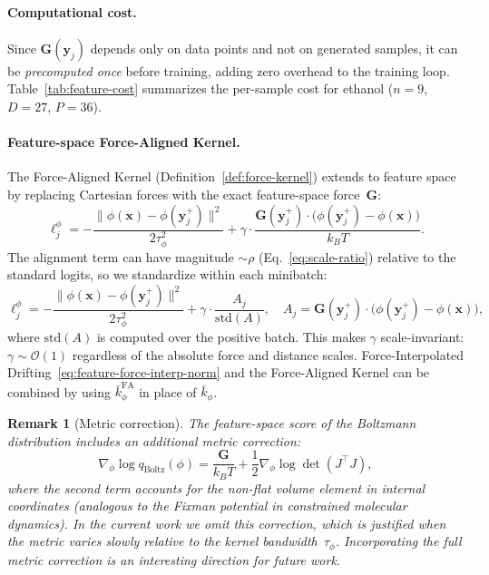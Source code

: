 \documentclass[11pt]{article}
\newtheorem{remark}{Remark}[section]
\newcommand{\bx}{\mathbf{x}}
\newcommand{\by}{\mathbf{y}}
\newcommand{\bG}{\mathbf{G}}
\newcommand{\kbar}{\bar{k}}
\newcommand{\kBT}{k_BT}
\begin{document}
\paragraph{Computational cost.}
Since $\bG(\by_j)$ depends only on data points and not on generated samples, it can be \emph{precomputed once} before training, adding zero overhead to the training loop.
Table~\ref{tab:feature-cost} summarizes the per-sample cost for ethanol ($n = 9$, $D = 27$, $P = 36$).

\paragraph{Feature-space Force-Aligned Kernel.}
The Force-Aligned Kernel (Definition~\ref{def:force-kernel}) extends to feature space by replacing Cartesian forces with the exact feature-space force~$\bG$:
\begin{equation}
    \ell_j^{\phi} = -\frac{\|\phi(\bx) - \phi(\by_j^+)\|^2}{2\tau_\phi^2} + \gamma \cdot \frac{\bG(\by_j^+) \cdot \big(\phi(\by_j^+) - \phi(\bx)\big)}{\kBT}.
    \label{eq:feature-force-kernel-logits}
\end{equation}
The alignment term can have magnitude ${\sim}\rho$ (Eq.~\ref{eq:scale-ratio}) relative to the standard logits, so we standardize within each minibatch:
\begin{equation}
    \ell_j^{\phi} = -\frac{\|\phi(\bx) - \phi(\by_j^+)\|^2}{2\tau_\phi^2} + \gamma \cdot \frac{A_j}{\mathrm{std}(A)}, \quad A_j = \bG(\by_j^+) \cdot \big(\phi(\by_j^+) - \phi(\bx)\big),
    \label{eq:feature-force-kernel-norm}
\end{equation}
where $\mathrm{std}(A)$ is computed over the positive batch.
This makes $\gamma$ scale-invariant: $\gamma \sim \mathcal{O}(1)$ regardless of the absolute force and distance scales.
Force-Interpolated Drifting~\eqref{eq:feature-force-interp-norm} and the Force-Aligned Kernel can be combined by using $\kbar_\phi^{\text{FA}}$ in place of $\kbar_\phi$.

\begin{remark}[Metric correction]
\label{rem:metric}
The feature-space score of the Boltzmann distribution includes an additional \emph{metric correction}:
\begin{equation}
    \nabla_\phi \log q_{\text{Boltz}}(\phi) = \frac{\bG}{\kBT} + \frac{1}{2}\nabla_\phi \log\det(J^\top J),
    \label{eq:metric-correction}
\end{equation}
where the second term accounts for the non-flat volume element in internal coordinates (analogous to the Fixman potential in constrained molecular dynamics).
In the current work we omit this correction, which is justified when the metric varies slowly relative to the kernel bandwidth~$\tau_\phi$.
Incorporating the full metric correction is an interesting direction for future work.
\end{remark}
\end{document}
